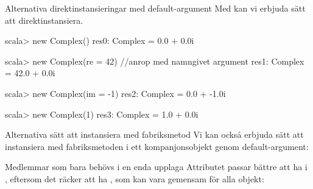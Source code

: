 \begin{Slide}{Alternativa direktinstansieringar med default-argument}\SlideFontSmall
Med  kan vi erbjuda  sätt att direktinstansiera.
\begin{REPL}
scala> new Complex()
res0: Complex = 0.0 + 0.0i

scala> new Complex(re = 42)  //anrop med namngivet argument
res1: Complex = 42.0 + 0.0i

scala> new Complex(im = -1)
res2: Complex = 0.0 + -1.0i

scala> new Complex(1)
res3: Complex = 1.0 + 0.0i
\end{REPL}
\end{Slide}

\begin{Slide}{Alternativa sätt att instansiera med fabriksmetod}
Vi kan också erbjuda  sätt att instansiera  med fabriksmetoden  i ett kompanjonsobjekt genom default-argument:

\end{Slide}

\begin{Slide}{Medlemmar som bara behövs i en enda upplaga}
Attributet  passar bättre att ha i , eftersom det räcker att ha , som kan vara gemensam för alla objekt:

\end{Slide}



